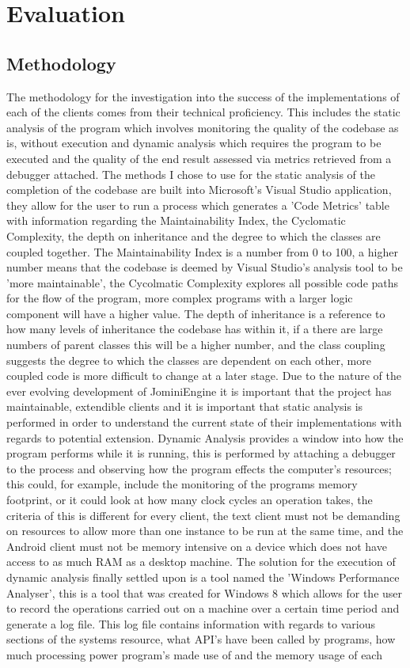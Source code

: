 \documentclass{article}
\begin{document}
\section{Evaluation}
\subsection{Methodology}
The methodology for the investigation into the success of the implementations of each of the clients comes from their technical proficiency. This includes the static analysis of the program which involves monitoring the quality of the codebase as is, without execution and dynamic analysis which requires the program to be executed and the quality of the end result assessed via metrics retrieved from a debugger attached. The methods I chose to use for the static analysis of the completion of the codebase are built into Microsoft's Visual Studio application, they allow for the user to run a process which generates a 'Code Metrics' table with information regarding the Maintainability Index, the Cyclomatic Complexity, the depth on inheritance and the degree to which the classes are coupled together. The Maintainability Index is a number from 0 to 100, a higher number means that the codebase is deemed by Visual Studio's analysis tool to be 'more maintainable', the Cycolmatic Complexity explores all possible code paths for the flow of the program, more complex programs with a larger logic component will have a higher value. The depth of inheritance is a reference to how many levels of inheritance the codebase has within it, if a there are large numbers of parent classes this will be a higher number, and the class coupling suggests the degree to which the classes are dependent on each other, more coupled code is more difficult to change at a later stage. Due to the nature of the ever evolving development of JominiEngine it is important that the project has maintainable, extendible clients and it is important that static analysis is performed in order to understand the current state of their implementations with regards to potential extension. Dynamic Analysis provides a window into how the program performs while it is running, this is performed by attaching a debugger to the process and observing how the program effects the computer's resources; this could, for example, include the monitoring of the programs memory footprint, or it could look at how many clock cycles an operation takes, the criteria of this is different for every client, the text client must not be demanding on resources to allow more than one instance to be run at the same time, and the Android client must not be memory intensive on a device which does not have access to as much RAM as a desktop machine. The solution for the execution of dynamic analysis finally settled upon is a tool named the 'Windows Performance Analyser', this is a tool that was created for Windows 8 which allows for the user to record the operations carried out on a machine over a certain time period and generate a log file. This log file contains information with regards to various sections of the systems resource, what API's have been called by programs, how much processing power program's made use of and the memory usage of each 
\end{document}
